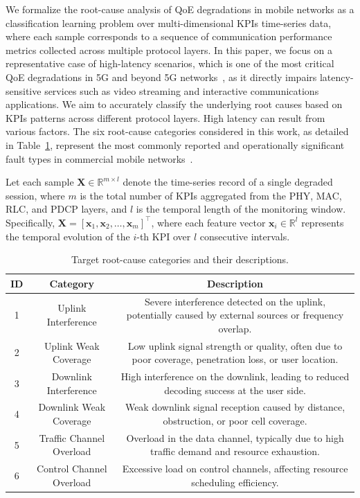 \documentclass[lettersize,journal]{IEEEtran}
\begin{document}
We formalize the root-cause analysis of QoE degradations in mobile networks as a classification learning problem over multi-dimensional KPIs time-series data, where each sample corresponds to a sequence of communication performance metrics collected across multiple protocol layers. 
In this paper, we focus on a representative case of high-latency scenarios, {\color{R1color}which is one of the most critical QoE degradations in 5G and beyond 5G networks~\cite{10077211}, as it directly impairs latency-sensitive services such as video streaming and interactive communications applications.} We aim to accurately classify the underlying root causes based on KPIs patterns across different protocol layers.
High latency can result from various factors. {\color{R1color}The six root-cause categories considered in this work, as detailed in Table~\ref{tab:category_description}, represent the most commonly reported and operationally significant fault types in commercial mobile networks~\cite{klaine2017survey, ramirez2023explainable, yuan2020anomaly}.}

Let each sample $\mathbf{X} \in \mathbb{R}^{m \times l}$ denote the time-series record of a single degraded session, where $m$ is the total number of KPIs aggregated from the PHY, MAC, RLC, and PDCP layers, and $l$ is the temporal length of the monitoring window. Specifically, $\mathbf{X} = [\mathbf{x}_1, \mathbf{x}_2, \ldots, \mathbf{x}_m]^\top$, where each feature vector $\mathbf{x}_i \in \mathbb{R}^{l}$ represents the temporal evolution of the $i$-th KPI over $l$ consecutive intervals.


\begin{table}
\centering
\caption{Target root-cause categories and their descriptions.}
\renewcommand{\arraystretch}{1.1}
\begin{tabular}{|c|c|c|}
\hline
\textbf{ID} & \textbf{Category} & \textbf{Description} \\
\hline
    1 & Uplink Interference & Severe interference detected on the uplink, potentially caused by external sources or frequency overlap. \\
    2 & Uplink Weak Coverage & Low uplink signal strength or quality, often due to poor coverage, penetration loss, or user location. \\
    3 & Downlink Interference & High interference on the downlink, leading to reduced decoding success at the user side. \\
    4 & Downlink Weak Coverage & Weak downlink signal reception caused by distance, obstruction, or poor cell coverage. \\
    5 & Traffic Channel Overload & Overload in the data channel, typically due to high traffic demand and resource exhaustion. \\
    6 & Control Channel Overload & Excessive load on control channels, affecting resource scheduling efficiency. \\
\hline
\end{tabular}
\label{tab:category_description}
\end{table}
\end{document}
